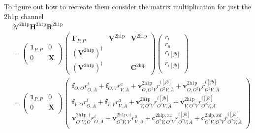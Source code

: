 \begin{tcolorbox}[colback=red!10!white, colframe=red!50!black, title=It is unclear where these equations come from]
\end{tcolorbox}

To figure out how to recreate them consider the matrix multiplication for just the 2h1p channel
\begin{align}
&\bm{\mathcal{N}}^{2\mathrm{h1p}} \bm{H}^{2\mathrm{h1p}} \bm{R}^{2\mathrm{h1p}} \\
&= \begin{pmatrix}
\bm{1}_{P,P} & 0 \\
0 & \bm{X} \\
\end{pmatrix}
\begin{pmatrix}
\bm{F}_{P,P} & \bm{V}^{2\mathrm{h1p}} & \bm{V}^{2\mathrm{h1p}} \\
\left(\bm{V}^{2\mathrm{h1p}}\right)^{\dagger} &  &  \\
\left(\bm{V}^{2\mathrm{h1p}}\right)^{\dagger} &  & \bm{C}^{2\mathrm{hlp}}
\end{pmatrix}
\begin{pmatrix}
r_i \\
r_a \\
r_{i[j b]} \\
\bar{r}_{i[j b]} \\
\end{pmatrix}\\
&= \begin{pmatrix}
\bm{1}_{P,P} & 0 \\
0 & \bm{X} \\
\end{pmatrix}
\begin{pmatrix}
\bm{f}_{O,O}r^i_{O,\bar{A}} + \bm{f}_{O,V}r^a_{V,\bar{A}} + \bm{v}^{2\mathrm{h1p}}_{O,O^2V} r^{i[j b]}_{O^2V, \bar{A}} + \bm{v}^{2\mathrm{h1p}}_{O,O^2V} \bar{r}^{i[j b]}_{O^2V, \bar{A}} \\
\bm{f}_{V,O}r^i_{O,\bar{A}} + \bm{f}_{V,V}r^a_{V,\bar{A}} + \bm{v}^{2\mathrm{h1p}}_{V,O^2V} r^{i[j b]}_{O^2V, \bar{A}} + \bm{v}^{2\mathrm{h1p}}_{V,O^2V} \bar{r}^{i[j b]}_{O^2V, \bar{A}} \\
\bm{v}^{2\mathrm{h1p},\dagger}_{O^2V,O} r^i_{O,\bar{A}} + \bm{v}^{2\mathrm{h1p},\dagger}_{O^2V,V} r^a_{V,\bar{A}} + \bm{c}^{2\mathrm{hlp},xx}_{O^2V,O^2V} r^{i[j b]}_{O^2V, \bar{A}} + \bm{c}^{2\mathrm{hlp},xd}_{O^2V,O^2V} \bar{r}^{i[j b]}_{O^2V, \bar{A}} \\

\end{pmatrix}
\end{align}
